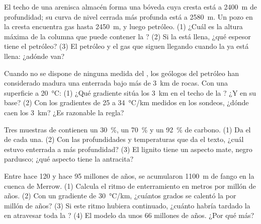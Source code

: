 \begin{exercise}[$\star\star$]\label{exo:g11:fossil-fuel-geology:9}
El techo de una arenisca almacén forma una bóveda cuya cresta está a
\qty{2400}{m} de profundidad; su curva de nivel cerrada más profunda está a
\qty{2580}{m}. Un pozo en la cresta encuentra gas hasta \qty{2450}{m}, y luego
petróleo. (1) ¿Cuál es la altura máxima de la columna que puede contener la
? (2) Si la  está llena, ¿qué espesor tiene el petróleo? (3) El
petróleo y el gas que siguen llegando cuando la  ya está llena: ¿adónde
van?
\end{exercise}

\begin{exercise}[$\star\star$]\label{exo:g11:fossil-fuel-geology:10}
Cuando no se dispone de ninguna medida del , los geólogos del
petróleo han considerado madura una  enterrada bajo más de
\qty{3}{km} de rocas. Con una superficie a \qty{20}{\degreeCelsius}: (1) ¿Qué
gradiente sitúa los \qty{3}{km} en el techo de la ? ¿Y en
su base? (2) Con los gradientes de 25 a \qty{34}{\degreeCelsius/km} medidos en
los sondeos, ¿dónde caen los \qty{3}{km}? ¿Es razonable la regla?
\end{exercise}

\begin{exercise}[$\star\star$]\label{exo:g11:fossil-fuel-geology:11}
Tres muestras de  contienen un \qty{30}{\percent}, un \qty{70}{\percent}
y un \qty{92}{\percent} de carbono. (1) Da el  de cada una. (2) Con las
profundidades y temperaturas que da el texto, ¿cuál estuvo enterrada a más
profundidad? (3) El lignito tiene un aspecto mate, negro pardusco; ¿qué
aspecto tiene la antracita?
\end{exercise}

\begin{exercise}[$\star\star\star$]\label{exo:g11:fossil-fuel-geology:12}
Entre hace 120 y hace 95 millones de años, se acumularon \qty{1100}{m} de fango
en la cuenca de Merrow. (1) Calcula el ritmo de enterramiento en metros por
millón de años. (2) Con un gradiente de \qty{30}{\degreeCelsius/km}, ¿cuántos
grados se calentó la  por millón de años? (3) Si este ritmo
hubiera continuado, ¿cuánto habría tardado la  en atravesar
toda la ? (4) El modelo da unos 66 millones de años. ¿Por
qué más?
\end{exercise}

